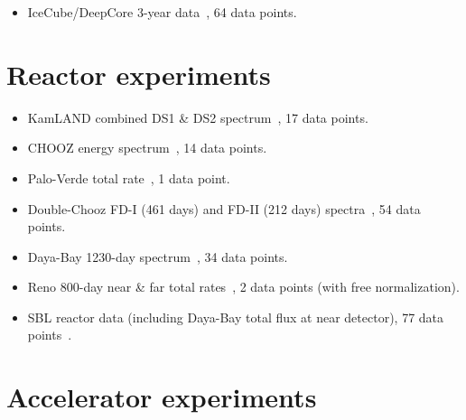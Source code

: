 \documentclass[a4paper, 11pt]{article}
\begin{document}
\begin{itemize}
\item IceCube/DeepCore 3-year data~\cite{Aartsen:2014yll,
  deepcore:2016}, 64 data points.
\end{itemize}

\section*{Reactor experiments}

\begin{itemize}
\setlength{\itemsep}{0mm}
\item KamLAND combined DS1 \& DS2 spectrum~\cite{Gando:2010aa}, 17
  data points.

\item CHOOZ energy spectrum~\cite{Apollonio:1999ae}, 14 data points.

\item Palo-Verde total rate~\cite{Piepke:2002ju}, 1 data point.

\item Double-Chooz FD-I (461 days) and FD-II (212 days)
  spectra~\cite{dc:moriond2016}, 54 data points.

\item Daya-Bay 1230-day spectrum~\cite{db:nu2016}, 34 data
  points.

\item Reno 800-day near \& far total rates~\cite{reno:nu2014}, 2
  data points (with free normalization).

\item SBL reactor data (including Daya-Bay total flux at near
  detector), 77 data points~\cite{Kopp:2013vaa, db:nu2014}.
\end{itemize}

\section*{Accelerator experiments}
\end{document}
